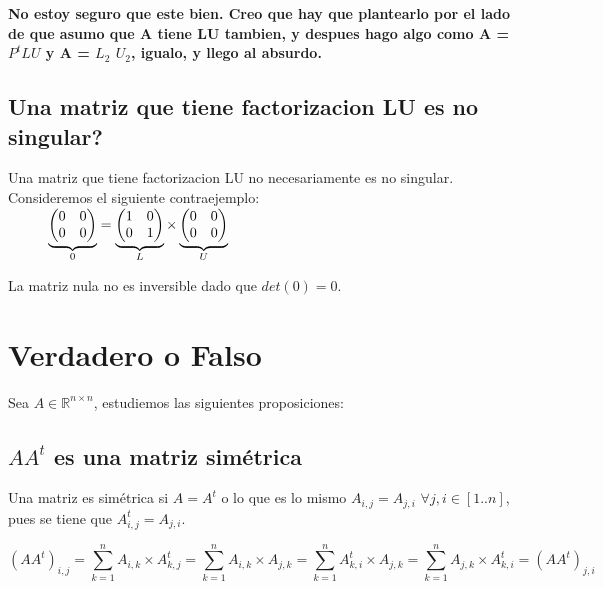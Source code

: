 \documentclass[10pt,a4paper]{article}
\begin{document}
\textbf{No estoy seguro que este bien. Creo que hay que plantearlo por el lado de que asumo que A tiene LU tambien, y despues hago algo como A = $P^tLU$ y A = $L_2$ $U_2$, igualo, y llego al absurdo.}
\fi
\pagebreak

\subsection{Una matriz que tiene factorizacion LU es no singular?}

Una matriz que tiene factorizacion LU no necesariamente es no singular. Consideremos el siguiente contraejemplo:
\\

$
\hspace{10mm}
\underbrace{\left(
\begin{matrix}
0 & 0 \\
0 & 0 \\
\end{matrix}\right)}_{0}
=
\underbrace{\left(
\begin{matrix}
1 & 0 \\
0 & 1 \\
\end{matrix}\right)}_{L}
\times
\underbrace{\left(
\begin{matrix}
0 & 0 \\
0 & 0 \\
\end{matrix}\right)}_{U}$

La matriz nula no es inversible dado que $det(0)=0$.

\section{Verdadero o Falso}

Sea $A \in \mathbb{R}^{n \times n}$, estudiemos las siguientes proposiciones:

\subsection{$AA^t$ es una matriz simétrica}

Una matriz es simétrica si $A = A^t$ o lo que es lo mismo $A_{i,j} = A_{j,i}$ $\forall j,i \in [1..n]$, pues se tiene que $A_{i,j}^t = A_{j,i}$.

\begin{equation}
\left(AA^t\right)_{i,j} = \sum_{k=1}^{n} A_{i,k} \times A^t_{k,j} = \sum_{k=1}^{n} A_{i,k} \times A_{j,k} = \sum_{k=1}^{n} A^t_{k,i} \times A_{j,k} = \sum_{k=1}^{n} A_{j,k} \times A^t_{k,i} = \left(AA^t\right)_{j,i} 
\end{equation}
\end{document}
